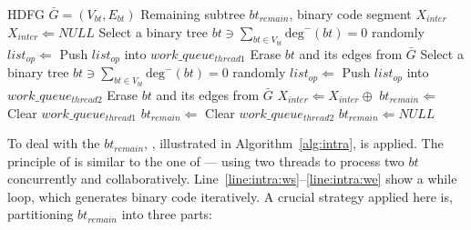 \begin{algorithm}[ht!]
    \caption{}
    \begin{algorithmic}[1]
        \Require    HDFG $\bar{G} = (V_{bt}, E_{bt})$
        \Ensure     Remaining subtree $bt_{remain}$, binary code segment $X_{inter}$
        \State $X_{inter} \Leftarrow NULL$       
         \label{line:interws}
        \State Select a binary tree $bt \ni \sum_{bt \in V_{bt}}\textrm{deg}^-(bt) = 0$ randomly
        \State $list_{op} \Leftarrow$ 
        \State Push $list_{op}$ into $work\_queue_{thread1}$
        \State Erase $bt$ and its edges from $\bar{G}$
        \EndIf
        \State Select a binary tree $bt \ni \sum_{bt \in V_{bt}}\textrm{deg}^-(bt) = 0$ randomly
        \State $list_{op} \Leftarrow$ 
        \State Push $list_{op}$ into $work\_queue_{thread2}$
        \State Erase $bt$ and its edges from $\bar{G}$
        \EndIf
        \State $X_{inter} \Leftarrow X_{inter} \oplus$  \label{line:intercon}
        \EndWhile \label{line:interwe}
         \label{line:interis}
        \State $bt_{remain} \Leftarrow$ 
        \State Clear $work\_queue_{thread1}$
        \State $bt_{remain} \Leftarrow$ 
        \State Clear $work\_queue_{thread2}$
        \Else
        \State $bt_{remain} \Leftarrow NULL$
        \EndIf \label{line:interie}
        \State {}
    \end{algorithmic}
    \label{alg:inter}
\end{algorithm}
\indent 
To deal with the $bt_{remain}$, , illustrated in Algorithm~\ref{alg:intra}, is applied.
The principle of  is similar to the one of  ---
using two threads to process two $bt$ concurrently and collaboratively.
Line~\ref{line:intra:ws}--\ref{line:intra:we} show a while loop, 
which generates binary code iteratively.
A crucial strategy applied here is, partitioning $bt_{remain}$ into three parts:

